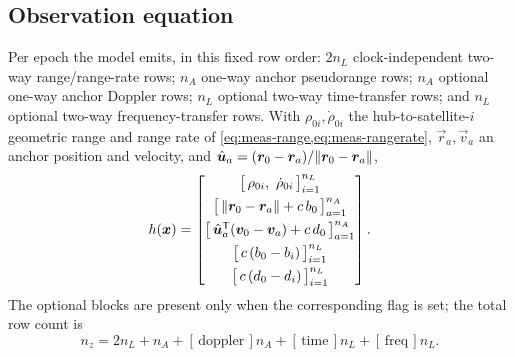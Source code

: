 \subsection{Observation equation}

Per epoch the model emits, in this fixed row order: $2n_L$ clock-independent
two-way range/range-rate rows; $n_A$ one-way anchor pseudorange rows; $n_A$
optional one-way anchor Doppler rows; $n_L$ optional two-way time-transfer
rows; and $n_L$ optional two-way frequency-transfer rows. With
$\rho_{0i}, \dot\rho_{0i}$ the hub-to-satellite-$i$ geometric range and range
rate of \cref{eq:meas-range,eq:meas-rangerate}, $\vec{r}_a, \vec{v}_a$ an
anchor position and velocity, and
$\hat{\bm{u}}_a = (\bm{r}_0 - \bm{r}_a)/\lVert \bm{r}_0 - \bm{r}_a\rVert$,
\begin{equation}
  h(\bm{x})
  =
  \begin{bmatrix}
    \big[\,\rho_{0i},\ \dot{\rho}_{0i}\,\big]_{i=1}^{n_L} \\[4pt]
    \big[\,\lVert \bm{r}_0 - \bm{r}_a\rVert + c\,b_0\,\big]_{a=1}^{n_A} \\[4pt]
    \big[\,\hat{\bm{u}}_a^{\mathsf{T}}(\bm{v}_0 - \bm{v}_a) + c\,d_0\,\big]_{a=1}^{n_A} \\[4pt]
    \big[\,c\,(b_0 - b_i)\,\big]_{i=1}^{n_L} \\[4pt]
    \big[\,c\,(d_0 - d_i)\,\big]_{i=1}^{n_L}
  \end{bmatrix}.
  \label{eq:meas-xl-h}
\end{equation}
The optional blocks are present only when the corresponding 
flag is set; the total row count is
\begin{equation}
  n_z = 2 n_L + n_A + [\,\text{doppler}\,] n_A
        + [\,\text{time}\,] n_L + [\,\text{freq}\,] n_L .
  \label{eq:meas-xl-rows}
\end{equation}

